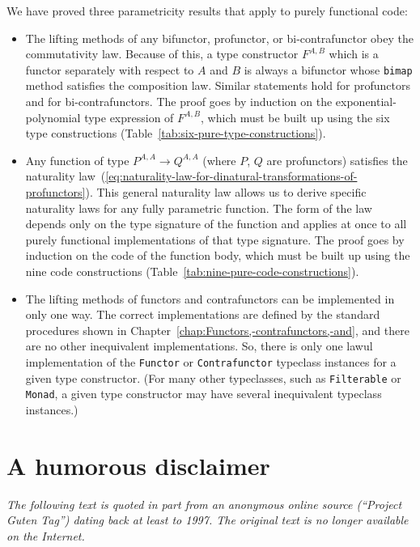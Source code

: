 We have proved three parametricity results that apply to purely functional
code:
\begin{itemize}
\item The lifting methods of any bifunctor, profunctor, or bi-contrafunctor
obey the commutativity law. Because of this, a type constructor $F^{A,B}$
which is a functor separately with respect to $A$ and $B$ is always
a bifunctor whose \lstinline!bimap! method satisfies the composition
law. Similar statements hold for profunctors and for bi-contrafunctors.
The proof goes by induction on the exponential-polynomial type expression
of $F^{A,B}$, which must be built up using the six type constructions
(Table~\ref{tab:six-pure-type-constructions}).
\item Any function of type $P^{A,A}\rightarrow Q^{A,A}$ (where $P$, $Q$
are profunctors) satisfies the naturality law~(\ref{eq:naturality-law-for-dinatural-transformations-of-profunctors}).
This general naturality law allows us to derive specific naturality
laws for any fully parametric function. The form of the law depends
only on the type signature of the function and applies at once to
all purely functional implementations of that type signature. The
proof goes by induction on the code of the function body, which must
be built up using the nine code constructions (Table~\ref{tab:nine-pure-code-constructions}).
\item The lifting methods of functors and contrafunctors can be implemented
in only one way. The correct implementations are defined by the standard
procedures shown in Chapter~\ref{chap:Functors,-contrafunctors,-and},
and there are no other inequivalent implementations. So, there is
only one lawul implementation of the \lstinline!Functor! or \lstinline!Contrafunctor!
typeclass instances for a given type constructor. (For many other
typeclasses, such as \lstinline!Filterable! or \lstinline!Monad!,
a given type constructor may have several inequivalent typeclass instances.)
\end{itemize}

\chapter{A humorous disclaimer}

\emph{The following text is quoted in part from an anonymous online
source (``Project Guten Tag'') dating back at least to 1997. The
original text is no longer available on the Internet.}

\medskip{}

